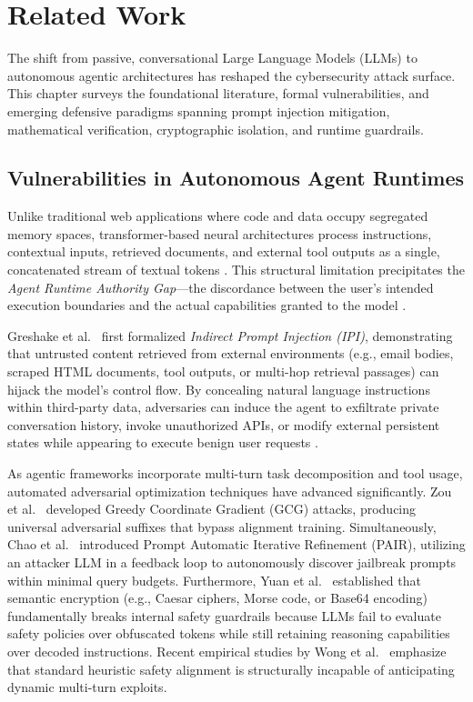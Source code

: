 \chapter{Related Work}
\label{ch:related_work}

The shift from passive, conversational Large Language Models (LLMs) to autonomous agentic architectures has reshaped the cybersecurity attack surface. This chapter surveys the foundational literature, formal vulnerabilities, and emerging defensive paradigms spanning prompt injection mitigation, mathematical verification, cryptographic isolation, and runtime guardrails.

\section{Vulnerabilities in Autonomous Agent Runtimes}
\label{sec:rel_vulnerabilities}

Unlike traditional web applications where code and data occupy segregated memory spaces, transformer-based neural architectures process instructions, contextual inputs, retrieved documents, and external tool outputs as a single, concatenated stream of textual tokens \cite{greshake2023indirect,owasp2026}. This structural limitation precipitates the \emph{Agent Runtime Authority Gap}---the discordance between the user's intended execution boundaries and the actual capabilities granted to the model \cite{jiang2026agentic}.

Greshake et al.~\cite{greshake2023indirect} first formalized \emph{Indirect Prompt Injection (IPI)}, demonstrating that untrusted content retrieved from external environments (e.g., email bodies, scraped HTML documents, tool outputs, or multi-hop retrieval passages) can hijack the model's control flow. By concealing natural language instructions within third-party data, adversaries can induce the agent to exfiltrate private conversation history, invoke unauthorized APIs, or modify external persistent states while appearing to execute benign user requests \cite{yi2024benchmarking}.

As agentic frameworks incorporate multi-turn task decomposition and tool usage, automated adversarial optimization techniques have advanced significantly. Zou et al.~\cite{zou2023gcg} developed Greedy Coordinate Gradient (GCG) attacks, producing universal adversarial suffixes that bypass alignment training. Simultaneously, Chao et al.~\cite{chao2023pair} introduced Prompt Automatic Iterative Refinement (PAIR), utilizing an attacker LLM in a feedback loop to autonomously discover jailbreak prompts within minimal query budgets. Furthermore, Yuan et al.~\cite{yuan2024cipherchat} established that semantic encryption (e.g., Caesar ciphers, Morse code, or Base64 encoding) fundamentally breaks internal safety guardrails because LLMs fail to evaluate safety policies over obfuscated tokens while still retaining reasoning capabilities over decoded instructions. Recent empirical studies by Wong et al.~\cite{wong2025defending} emphasize that standard heuristic safety alignment is structurally incapable of anticipating dynamic multi-turn exploits.

